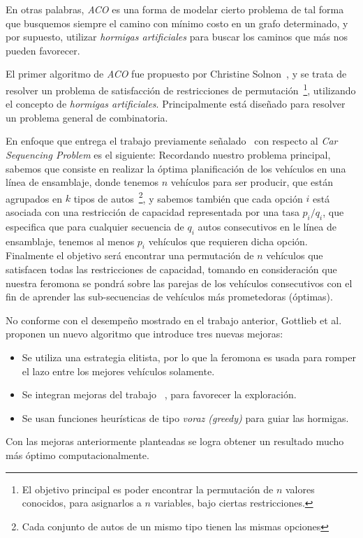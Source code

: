 En otras palabras, \emph{ACO} es una forma de modelar cierto problema de tal forma
que busquemos siempre el camino con mínimo costo en un grafo determinado, y por supuesto,
utilizar \emph{hormigas artificiales} para buscar los caminos que más nos pueden favorecer.


El primer algoritmo de \emph{ACO} fue propuesto por Christine Solnon~\cite{Sol00},
y se trata de resolver un problema de satisfacción de restricciones de permutación~\footnote{
El objetivo principal es poder encontrar la permutación de $n$ valores conocidos,
para asignarlos a $n$ variables, bajo ciertas restricciones.
},
utilizando el concepto de \emph{hormigas artificiales}. Principalmente está diseñado
para resolver un problema general de combinatoria.

En enfoque que entrega el trabajo previamente señalado~\cite{Sol00} con respecto
al \emph{Car Sequencing Problem} es el siguiente:
Recordando nuestro problema principal, sabemos que consiste
en realizar la óptima planificación de los vehículos en una línea de ensamblaje,
donde tenemos $n$ vehículos para ser producir, que están agrupados en $k$ tipos
de autos~\footnote{
Cada conjunto de autos de un mismo tipo tienen las mismas opciones
}, y sabemos también que cada opción $i$ está asociada con una restricción de capacidad
representada por una tasa $p_i/q_i$, que especifica que para cualquier secuencia
de $q_i$ autos consecutivos en le línea de ensamblaje, tenemos al menos $p_i$ vehículos
que requieren dicha opción.
Finalmente el objetivo será encontrar una permutación de $n$ vehículos que satisfacen
todas las restricciones de capacidad, tomando en consideración que nuestra feromona
se pondrá sobre las parejas de los vehículos consecutivos con el fin de aprender
las sub-secuencias de vehículos más prometedoras (óptimas).

No conforme con el desempeño mostrado en el trabajo anterior, Gottlieb et al.~\cite{GPS03}
proponen un nuevo algoritmo que introduce tres nuevas mejoras:
\begin{itemize}
	\item Se utiliza una estrategia elitista, por lo que la feromona es usada para romper el lazo entre los mejores vehículos solamente.
	\item Se integran mejoras del trabajo ~\cite{Stu}, para favorecer la exploración.
	\item Se usan funciones heurísticas de tipo \emph{voraz (greedy)} para guiar las hormigas.
\end{itemize}
Con las mejoras anteriormente planteadas se logra obtener un resultado mucho más óptimo computacionalmente.

